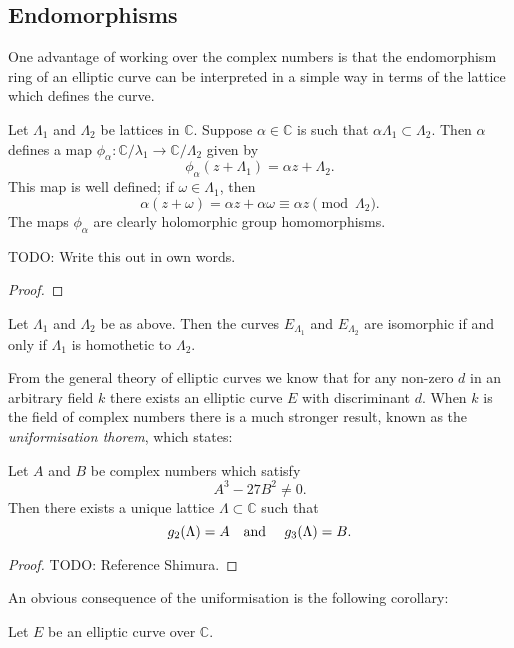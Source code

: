 \subsection{Endomorphisms}
\label{sec:endomorphisms}

One advantage of working over the complex numbers is that the endomorphism ring of an
elliptic curve can be interpreted in a simple way in terms of the lattice which
defines the curve.

Let $\Lambda_{1}$ and $\Lambda_{2}$ be lattices in $\mathbb{C}$. Suppose $\alpha \in
\mathbb{C}$ is such that $\alpha\Lambda_{1} \subset \Lambda_{2}$.  Then $\alpha$
defines a map $\phi_{\alpha} \colon \mathbb{C}/\lambda_{1} \rightarrow
\mathbb{C}/\Lambda_{2}$ given by
\begin{equation*}
  \phi_{\alpha}(z + \Lambda_{1}) = \alpha z + \Lambda_{2}.
\end{equation*}
This map is well defined; if $\omega \in \Lambda_{1}$, then
\begin{equation*}
  \alpha(z + \omega) = \alpha z + \alpha\omega \equiv \alpha z \pmod{\Lambda_{2}}.
\end{equation*}
The maps $\phi_{\alpha}$ are clearly holomorphic group homomorphisms.

\begin{prop}
  \label{prop:complex-isogenies}
  TODO: Write this out in own words.
\end{prop}
\begin{proof}
  
\end{proof}

\begin{cor}
  \label{cor:homothetic-lattices-give-isomorphic-curves}
  Let $\Lambda_{1}$ and $\Lambda_{2}$ be as above.  Then the curves $E_{\Lambda_{1}}$
  and $E_{\Lambda_{2}}$ are isomorphic if and only if $\Lambda_{1}$ is homothetic to $\Lambda_{2}$.
\end{cor}

From the general theory of elliptic curves we know that for any non-zero $d$ in an
arbitrary field $k$ there exists an elliptic curve $E$ with discriminant $d$.  When
$k$ is the field of complex numbers there is a much stronger result, known as the
\emph{uniformisation thorem}, which states:

\begin{thm}
  \label{thm:uniformisation-theorem}
  Let $A$ and $B$ be complex numbers which satisfy
  \begin{equation*}
    A^{3} - 27B^{2} \neq 0.
  \end{equation*}
  Then there exists a unique lattice $\Lambda \subset \mathbb{C}$ such that
  \begin{equation*}
    g_{2}(\Lambda) = A \text{\quad and \quad} g_{3}(\Lambda) = B.
  \end{equation*}
\end{thm}
\begin{proof}
  TODO: Reference Shimura.
\end{proof}

An obvious consequence of the uniformisation is the following corollary:

\begin{cor}
  \label{cor:uniformisation-corollary}
  Let $E$ be an elliptic curve over $\mathbb{C}$.
\end{cor}

